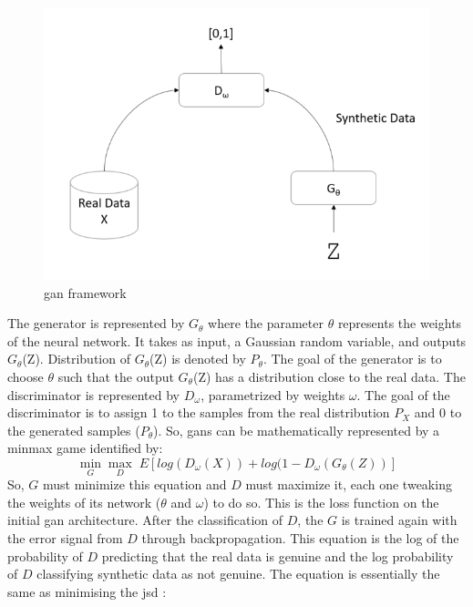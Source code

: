\begin{figure}
\centering
\includegraphics[scale=0.75]{figures/image.png}

\caption{\ac{gan} framework} \label{fig:gan-arch}
\end{figure}
The generator is represented by $G_{\theta}$ where the parameter $\theta$ represents the weights of
the neural network. It takes as input, a Gaussian random variable, and outputs $G_{\theta}$(Z).
Distribution of $G_{\theta}$(Z) is denoted by $P_{\theta}$. The goal of the generator is to choose $\theta$ such that the output $G_{\theta}$(Z) has a distribution close to the real data. The discriminator is represented by $D_{\omega}$, parametrized by weights $\omega$. The goal of the discriminator is to assign 1 to the samples from the real distribution $P_{X}$ and 0 to the generated samples ($P_{\theta}$). So, \acp{gan} can be mathematically represented by a minmax game identified by:
\begin{equation}
\min_{G}\max_{D} \; E [log(D_{\omega}(X)) + log(1-D_{\omega}(G_{\theta}(Z))]
\end{equation}
So, $G$ must minimize this equation and $D$ must maximize it, each one tweaking the weights of its network ($\theta$ and $\omega$) to do so. This is the loss function on the initial \ac{gan} architecture. After the classification of $D$, the $G$ is trained again with the error signal from $D$ through backpropagation. This equation is the log of the probability of $D$ predicting that the real data is genuine and the log probability of $D$ classifying synthetic data as not genuine. The equation is essentially the same as minimising the \ac{jsd} \cite{goodfellow_generative_2014}:
